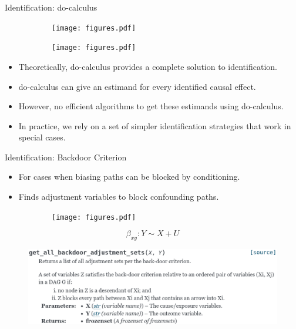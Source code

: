 \documentclass[aspectratio=169]{beamer}
\begin{document}
\begin{frame}{Identification: do-calculus}
	\begin{figure}
		\begin{subfigure}{0.5 \textwidth}
			\centering
			\texttt{[image: figures.pdf]}
		\end{subfigure}%
		\begin{subfigure}{0.5 \textwidth}
			\centering
			\texttt{[image: figures.pdf]}
		\end{subfigure}
		\label{fig:idnent}
	\end{figure}

	\begin{itemize}
		\item Theoretically, do-calculus provides a complete solution to identification.
		\item do-calculus can give an estimand for every identified causal effect.
		\item However, no efficient algorithms to get these estimands using do-calculus.
		\item In practice, we rely on a set of simpler identification strategies that work in special cases.
	\end{itemize}
\end{frame}

\begin{frame}{Identification: Backdoor Criterion}
	\begin{itemize}
		\item For cases when biasing paths can be blocked by conditioning.
		\item Finds adjustment variables to block confounding paths.
	\end{itemize}
	\begin{figure}
		\begin{subfigure}[c]{0.5\textwidth}
			\centering
			\texttt{[image: figures.pdf]}
		\end{subfigure}%
		\begin{subfigure}[c]{0.5 \textwidth}
			\begin{equation*}
				\beta_{xy}: Y \sim X + U
			\end{equation*}
		\end{subfigure}
	\end{figure}

	\begin{figure}
		\centering
		\includegraphics[scale=0.25]{imgs/backdoor.png}
	\end{figure}

\end{frame}
\end{document}
